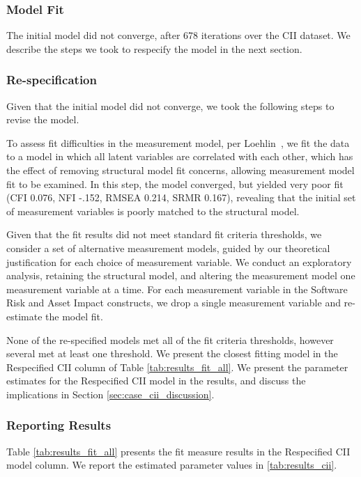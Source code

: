 \subsubsection{Model Fit}
The initial model did not converge, after 678 iterations over the CII dataset. We describe the steps we took to respecify the model in the next section.
 
\subsubsection{Re-specification}
Given that the initial model did not converge, we took the following steps to revise the model.

To assess fit difficulties in the measurement model, per Loehlin~\cite{loehlin1986latent}, we fit the data to a model in which all latent variables are correlated with each other, which has the effect of removing structural model fit concerns, allowing measurement model fit to be examined. In this step, the model converged, but yielded very poor fit (CFI 0.076, NFI -.152, RMSEA 0.214, SRMR 0.167), revealing that the initial set of measurement variables is poorly matched to the structural model.  

Given that the fit results did not meet standard fit criteria thresholds, we consider a set of alternative measurement models, guided by our theoretical justification for each choice of measurement variable. We conduct an exploratory analysis, retaining the structural model, and altering the measurement model one measurement variable at a time. For each measurement variable in the Software Risk and Asset Impact constructs, we drop a single measurement variable and re-estimate the model fit. 

None of the re-specified models met all of the fit criteria thresholds, however several met at least one threshold. We present the closest fitting model in the Respecified CII column of Table \ref{tab:results_fit_all}. We present the parameter estimates for the Respecified CII model in the results, and discuss the implications in Section \ref{sec:case_cii_discussion}.

\subsubsection{Reporting Results}
\label{sec:case_cii_results}

Table \ref{tab:results_fit_all} presents the fit measure results in the Respecified CII model column. We report the estimated parameter values in \ref{tab:results_cii}.

